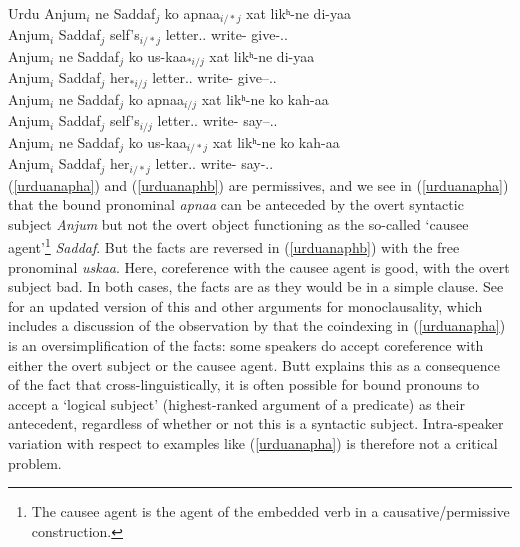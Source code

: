\documentclass[output=paper,hidelinks]{langscibook}
\begin{document}
\ea\label{urduanaph}Urdu
\ea\label{urduanapha}
\gll Anjum$_i$ ne       Saddaf$_j$ ko apnaa$_{i/*j}$  xat likʰ-ne di-yaa\\
  Anjum$_i$ {\ERG} Saddaf$_j$ {\DAT} self's$_{i/*j}$ letter.{\M.\NOM} write-{\INF}  give-\PRF.\M.\SG\\
\ex\label{urduanaphb}
\gll Anjum$_i$ ne        Saddaf$_j$ ko us-kaa$_{*i/j}$ xat              likʰ-ne di-yaa\\
  Anjum$_i$ {\ERG} Saddaf$_j$ {\DAT} her$_{*i/j}$ letter.{\M.\NOM} write-{\INF} give--\PRF.\M.\SG\\
\ex\label{urduanaphc}
\gll Anjum$_i$ ne        Saddaf$_j$ ko   apnaa$_{i/j}$ xat              likʰ-ne  ko     kah-aa\\
 Anjum$_i$ {\ERG} Saddaf$_j$ {\DAT} self's$_{i/j}$  letter.{\M.\NOM} write-{\INF} {\ACC} say--\PRF.\M.\SG\\
\ex\label{urduanaphd}
\gll Anjum$_i$ ne      Saddaf$_j$ ko     us-kaa$_{i/*j}$ xat                 likʰ-ne ko     kah-aa\\
Anjum$_i$ {\ERG} Saddaf$_j$ {\DAT} her$_{i/*j}$ letter.{\M.\NOM} write-{\INF}   {\ACC} say-\PRF.\M.\SG\\
\z
\z
(\ref{urduanapha}) and (\ref{urduanaphb}) are permissives, and we see in (\ref{urduanapha}) that the bound pronominal \emph{apnaa} can be anteceded by the
overt syntactic subject \emph{Anjum} but not the overt object functioning as the
so-called `causee agent'\footnote
 {The causee agent is the agent of the embedded verb in a causative/permissive construction.}
\emph{Saddaf}.  But the facts are reversed in (\ref{urduanaphb}) with the free pronominal \emph{uskaa}. Here,
coreference with the causee agent is good, with the overt subject bad.  In both cases,
the facts are as they would be in a simple clause.
See \citet{Butt2014} for an updated version of this and other arguments for monoclausality, which
includes a discussion of the observation by \citet{Davison2013} that the coindexing in (\ref{urduanapha}) is an oversimplification
of the facts: some speakers do accept coreference with either the overt subject or the causee agent.
Butt explains this as a consequence of the fact that cross-linguistically, it is often possible
for bound pronouns to accept a `logical subject' (highest-ranked argument of a predicate) as their
antecedent, regardless of whether or not this is a syntactic subject.  Intra-speaker variation
with respect to examples like (\ref{urduanapha}) is therefore not a critical problem.
\end{document}
